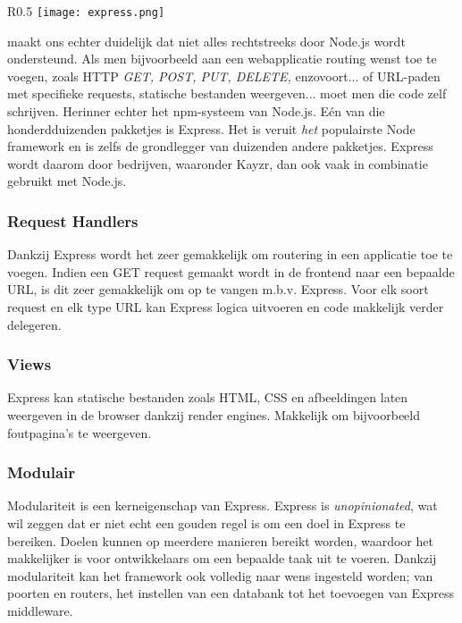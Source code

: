 \begin{wrapfigure}{R}{0.5\textwidth}
	\texttt{[image: express.png]}
\end{wrapfigure}\textcite{ExpressMozilla} maakt ons echter duidelijk dat niet alles rechtstreeks door Node.js wordt ondersteund. Als men bijvoorbeeld aan een webapplicatie routing wenst toe te voegen, zoals HTTP \textsl{GET, POST, PUT, DELETE,} enzovoort... of URL-paden met specifieke requests, statische bestanden weergeven... moet men die code zelf schrijven. Herinner echter het npm-systeem van Node.js. Eén van die honderdduizenden pakketjes is Express. Het is veruit \textit{het} populairste Node framework en is zelfs de grondlegger van duizenden andere pakketjes. Express wordt daarom door bedrijven, waaronder Kayzr, dan ook vaak in combinatie gebruikt met Node.js.

\subsubsection{Request Handlers}
\label{sec:reqHandlers}

Dankzij Express wordt het zeer gemakkelijk om routering in een applicatie toe te voegen. Indien een GET request gemaakt wordt in de frontend naar een bepaalde URL, is dit zeer gemakkelijk om op te vangen m.b.v. Express. Voor elk soort request en elk type URL kan Express logica uitvoeren en code makkelijk verder delegeren.

\subsubsection{Views}
\label{sec:expressViews}

Express kan statische bestanden zoals HTML, CSS en afbeeldingen laten weergeven in de browser dankzij render engines. Makkelijk om bijvoorbeeld foutpagina's te weergeven.

\subsubsection{Modulair}
\label{sec:expressModularity}

Modulariteit is een kerneigenschap van Express. Express is \textit{unopinionated}, wat wil zeggen dat er niet echt een gouden regel is om een doel in Express te bereiken. Doelen kunnen op meerdere manieren bereikt worden, waardoor het makkelijker is voor ontwikkelaars om een bepaalde taak uit te voeren. Dankzij modulariteit kan het framework ook volledig naar wens ingesteld worden; van poorten en routers, het instellen van een databank tot het toevoegen van Express middleware. 

